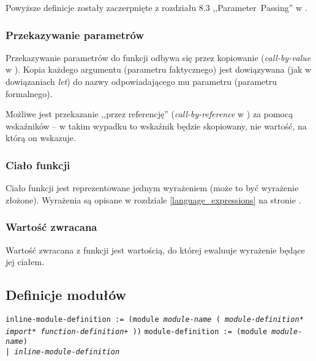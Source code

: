 Powyższe definicje zostały zaczerpnięte z rozdziału 8.3 ,,Parameter~Passing'' w
\cite{ProgrammingLanguagePragmatics}.

\subsubsection{Przekazywanie parametrów}

Przekazywanie parametrów do funkcji odbywa się przez kopiowanie
(\emph{call-by-value} w \cite{ProgrammingLanguagePragmatics}). Kopia każdego
argumentu (parametru faktycznego) jest dowiązywana (jak w dowiązaniach
\emph{let}) do nazwy odpowiadającego mu parametru (parametru formalnego).

Możliwe jest przekazanie ,,przez referencję'' (\emph{call-by-reference} w
\cite{ProgrammingLanguagePragmatics}) za pomocą wskaźników -- w takim wypadku to
wskaźnik będzie skopiowany, nie wartość, na którą on wskazuje.

\subsubsection{Ciało funkcji}

Ciało funkcji jest reprezentowane jednym wyrażeniem (może to być wyrażenie złożone).
Wyrażenia są opisane w rozdziale
\ref{language_expressions} na stronie \pageref{language_expressions}.

\subsubsection{Wartość zwracana}

Wartość zwracana z funkcji jest wartością, do której ewaluuje wyrażenie będące jej ciałem.

\subsection{Definicje modułów}
\label{viuact_spec_module_definition}

\texttt{inline-module-definition := (module \emph{module-name} (
\newline
\phantom{inline-module-definition := ~ }\emph{module-definition}*
\newline
\phantom{inline-module-definition := ~ }\emph{import}*
\newline
\phantom{inline-module-definition := ~ }\emph{function-definition}+
))}
\newline
\texttt{module-definition := (module \emph{module-name}) \\
\phantom{module-definition :}| \emph{inline-module-definition}}
\newline

